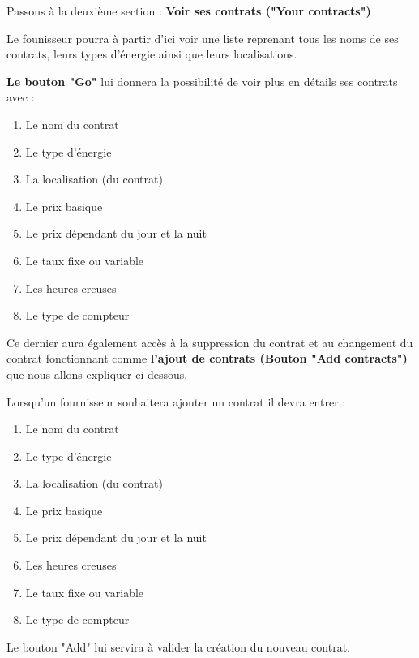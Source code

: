 \newpage

\begin{flushleft}
Passons à la deuxième section : \textbf{Voir ses contrats ("Your contracts")}
\end{flushleft}

\begin{flushleft}
Le founisseur pourra à partir d'ici voir une liste reprenant tous les noms de ses contrats, leurs types d'énergie ainsi que leurs localisations. 
\end{flushleft}

\begin{flushleft}
\textbf{Le bouton "Go"} lui donnera la possibilité de voir plus en détails ses contrats avec :
\end{flushleft}
\begin{enumerate}
\item Le nom du contrat
\item Le type d'énergie
\item La localisation (du contrat)
\item Le prix basique
\item Le prix dépendant du jour et la nuit
\item Le taux fixe ou variable
\item Les heures creuses
\item Le type de compteur
\end{enumerate}

\begin{flushleft}
Ce dernier aura également accès à la suppression du contrat et au changement du contrat fonctionnant comme \textbf{l'ajout de contrats (Bouton "Add contracts")} que nous allons expliquer ci-dessous.
\end{flushleft}

\begin{flushleft}
Lorsqu'un fournisseur souhaitera ajouter un contrat il devra entrer :
\end{flushleft}
\begin{enumerate}
\item Le nom du contrat
\item Le type d'énergie
\item La localisation (du contrat)
\item Le prix basique
\item Le prix dépendant du jour et la nuit
\item Les heures creuses
\item Le taux fixe ou variable
\item Le type de compteur
\end{enumerate}

\begin{flushleft}
Le bouton "Add" lui servira à valider la création du nouveau contrat.
\end{flushleft}

\newpage
